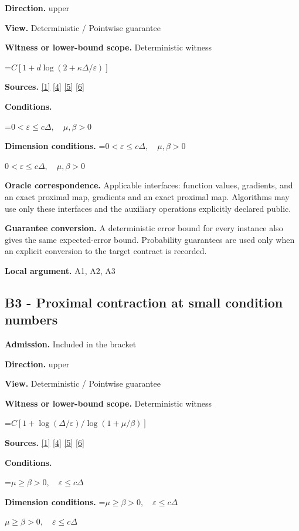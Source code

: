 \documentclass[10pt,a4paper]{article}
\newcommand{\AtlasMath}[1]{\par\begingroup\centering\setbox0=\hbox{$\displaystyle #1$}\ifdim\wd0>1.4\linewidth\typeout{ATLAS WIDE FORMULA: \the\wd0}\fi\ifdim\wd0>\linewidth\resizebox{\linewidth}{!}{\box0}\else\box0\fi\par\endgroup}
\newcommand{\AtlasInlineMath}[1]{\begingroup\setbox0=\hbox{$#1$}\ifdim\wd0>.4\linewidth\endgroup\AtlasMath{#1}\else\endgroup$#1$\fi}
\begin{document}
\textbf{Direction.} upper

\textbf{View.} Deterministic / Pointwise guarantee

\textbf{Witness or lower-bound scope.} Deterministic witness

\AtlasMath{C[1+d\log(2+\kappa\Delta/\varepsilon)]}
\textbf{Sources.} \href{https://www.tau.ac.il/~becka/FISTA.pdf}{[1]} \href{https://arxiv.org/pdf/1405.4980}{[4]} \href{https://www2.isye.gatech.edu/~nemirovs/MOR_AccuracyCertificates.pdf}{[5]} \href{https://arxiv.org/pdf/2609.20701}{[6]}

\textbf{Conditions.} 
\AtlasMath{0<\varepsilon\le c\Delta,\quad\mu,\beta>0}


\textbf{Dimension conditions.} \AtlasInlineMath{0<\varepsilon\le c\Delta,\quad\mu,\beta>0}

\textbf{Oracle correspondence.} Applicable interfaces: function values, gradients, and an exact proximal map, gradients and an exact proximal map. Algorithms may use only these interfaces and the auxiliary operations explicitly declared public.

\textbf{Guarantee conversion.} A deterministic error bound for every instance also gives the same expected-error bound. Probability guarantees are used only when an explicit conversion to the target contract is recorded.

\textbf{Local argument.} A1, A2, A3

\subsection{B3 - Proximal contraction at small condition numbers}
\textbf{Admission.} Included in the bracket

\textbf{Direction.} upper

\textbf{View.} Deterministic / Pointwise guarantee

\textbf{Witness or lower-bound scope.} Deterministic witness

\AtlasMath{C[1+\log(\Delta/\varepsilon)/\log(1+\mu/\beta)]}
\textbf{Sources.} \href{https://www.tau.ac.il/~becka/FISTA.pdf}{[1]} \href{https://arxiv.org/pdf/1405.4980}{[4]} \href{https://www2.isye.gatech.edu/~nemirovs/MOR_AccuracyCertificates.pdf}{[5]} \href{https://arxiv.org/pdf/2609.20701}{[6]}

\textbf{Conditions.} 
\AtlasMath{\mu\ge\beta>0,\quad\varepsilon\le c\Delta}


\textbf{Dimension conditions.} \AtlasInlineMath{\mu\ge\beta>0,\quad\varepsilon\le c\Delta}
\end{document}

